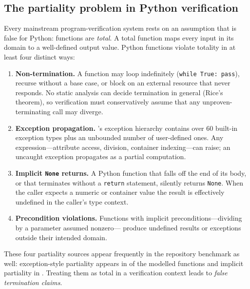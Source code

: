 \documentclass[11pt]{article}
\begin{document}
\subsection{The partiality problem in Python verification}

Every mainstream program-verification system rests on an assumption that
is false for Python: functions are \emph{total}.  A total function maps
every input in its domain to a well-defined output value.  Python
functions violate totality in at least four distinct ways:

\begin{enumerate}[label=(\roman*)]
  \item \textbf{Non-termination.}  A function may loop indefinitely
        (\lstinline{while True: pass}), recurse without a base case, or
        block on an external resource that never responds.  No static
        analysis can decide termination in general (Rice's theorem), so
        verification must conservatively assume that any
        unproven-terminating call may diverge.

  \item \textbf{Exception propagation.}  \Python{}'s exception hierarchy
        contains over 60 built-in exception types plus an unbounded
        number of user-defined ones.  Any expression---attribute access,
        division, container indexing---can raise; an uncaught exception
        propagates as a partial computation.

  \item \textbf{Implicit \texttt{None} returns.}  A Python function
        that falls off the end of its body, or that terminates without a
        \texttt{return} statement, silently returns \texttt{None}.  When
        the caller expects a numeric or container value the result is
        effectively undefined in the caller's type context.

  \item \textbf{Precondition violations.}  Functions with implicit
        preconditions---\eg dividing by a parameter assumed nonzero---
        produce undefined results or exceptions outside their intended
        domain.
\end{enumerate}

These four partiality sources appear frequently in the repository
benchmark as well: exception-style partiality appears in
\ppXXXVExceptPct{} of the modelled functions and implicit partiality in
\ppXXXVImplicitPct{}.  Treating them as total in a verification context
leads to \emph{false termination claims}.
\end{document}
